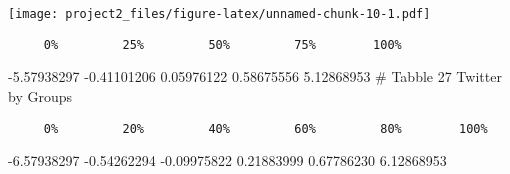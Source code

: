 \documentclass[
]{article}
\newenvironment{Shaded}{\begin{snugshade}}{\end{snugshade}}
\newcommand{\CommentTok}[1]{\textcolor[rgb]{0.56,0.35,0.01}{\textit{#1}}}
\newcommand{\DataTypeTok}[1]{\textcolor[rgb]{0.13,0.29,0.53}{#1}}
\newcommand{\DecValTok}[1]{\textcolor[rgb]{0.00,0.00,0.81}{#1}}
\newcommand{\KeywordTok}[1]{\textcolor[rgb]{0.13,0.29,0.53}{\textbf{#1}}}
\newcommand{\NormalTok}[1]{#1}
\newcommand{\OperatorTok}[1]{\textcolor[rgb]{0.81,0.36,0.00}{\textbf{#1}}}
\newcommand{\StringTok}[1]{\textcolor[rgb]{0.31,0.60,0.02}{#1}}
\begin{document}
\texttt{[image: project2\_files/figure-latex/unnamed-chunk-10-1.pdf]}

\begin{Shaded}
\end{Shaded}

\begin{verbatim}
     0%         25%         50%         75%        100% 
\end{verbatim}

-5.57938297 -0.41101206 0.05976122 0.58675556 5.12868953 \# Tabble 27
Twitter by Groups

\begin{Shaded}
\end{Shaded}

\begin{verbatim}
     0%         20%         40%         60%         80%        100% 
\end{verbatim}

-6.57938297 -0.54262294 -0.09975822 0.21883999 0.67786230 6.12868953
\end{document}

